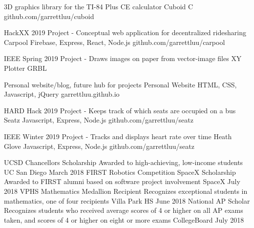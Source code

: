 \documentclass[]{awesome-cv}
\begin{document}
\vspace{-7mm}
\begin{cventries}
	\cventry
	{3D graphics library for the TI-84 Plus CE calculator}
	{Cuboid}
	{C}
	{github.com/garrettluu/cuboid}
	{}

	\vspace{-5mm}
	\cventry
  {HackXX 2019 Project - Conceptual web application for decentralized ridesharing}
  {Carpool}
	{Firebase, Express, React, Node.js}
	{github.com/garrettluu/carpool}
	{}

	\vspace{-5mm}
	\cventry
  {IEEE Spring 2019 Project - Draws images on paper from vector-image files}
	{XY Plotter}
	{GRBL}
  {}
	{}

	\vspace{-5mm}
	\cventry
	{Personal website/blog, future hub for projects}
	{Personal Website}
	{HTML, CSS, Javascript, jQuery}
	{garrettluu.github.io}
	{}

	\vspace{-5mm}
	\cventry
  {HARD Hack 2019 Project - Keeps track of which seats are occupied on a bus}
	{Seatz}
	{Javascript, Express, Node.js}
	{github.com/garrettluu/seatz}
  {}

  \vspace{-5mm}
	\cventry
  {IEEE Winter 2019 Project - Tracks and displays heart rate over time}
	{Heath Glove}
	{Javascript, Express, Node.js}
	{github.com/garrettluu/seatz}
  {}


\end{cventries}
\begin{cvhonors}
	\cvhonor
	{UCSD Chancellor\textquotesingle{}s Scholarship}
	{Awarded to high-achieving, low-income students}
	{UC San Diego}
	{March 2018}
	\cvhonor
	{FIRST Robotics Competition SpaceX Scholarship}
	{Awarded to FIRST alumni based on software project involvement}
	{SpaceX}
	{July 2018}
	\cvhonor
	{VPHS Mathematics Medallion Recipient}
	{Recognizes exceptional students in mathematics, one of four recipients}
	{Villa Park HS}
	{June 2018}
	\cvhonor
	{National AP Scholar}
	{Recognizes students who received average scores of 4 or higher on all AP
    exams taken, and scores of 4 or higher on eight or more exams}
	{CollegeBoard}
	{July 2018}
\end{cvhonors}
\end{document}
